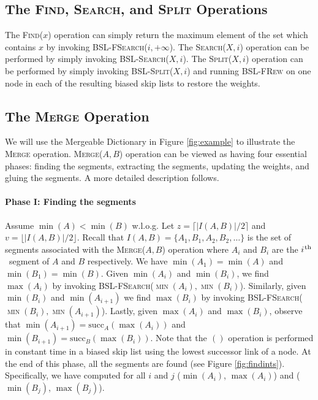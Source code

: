 \documentclass[11pt]{article}
\newcommand{\ens}[1]{\ensuremath{#1}}
\newcommand{\ith}{\ens{i^{\mbox{\hspace{.2mm}\scriptsize th}}}}
\newcommand{\Ds}{Mergeable Dictionary}
\newcommand{\kwMs}{Make-Set}
\newcommand{\kwSpl}{Split}
\newcommand{\kwUnion}{Merge}
\newcommand{\kwSrc}{Search}
\newcommand{\kwFind}{Find}
\newcommand{\Ms}{\mbox{\textsc{\kwMs}}}
\newcommand{\Spl}{\mbox{\textsc{\kwSpl}}}
\newcommand{\Splx}[2]{\mbox{\textsc{\kwSpl(\ensuremath{#1,#2})}}}
\newcommand{\Union}{\mbox{\textsc{\kwUnion{}}}}
\newcommand{\Unionx}[2]{\mbox{\textsc{\kwUnion(\ensuremath{#1,#2})}}}
\newcommand{\Src}{\mbox{\textsc{\kwSrc}}}
\newcommand{\Srcx}[2]{\mbox{\textsc{\kwSrc(\ensuremath{#1,#2})}}}
\newcommand{\Find}{\mbox{\textsc{\kwFind}}}
\newcommand{\Findx}[1]{\mbox{\textsc{\kwFind(\ensuremath{#1})}}}
\newcommand{\Bslfsrcx}[2]{\mbox{\textsc{BSL-FSearch(\ensuremath{#1,#2})}}}
\newcommand{\Bslfrew}{\mbox{\textsc{BSL-FRew}}}
\newcommand{\Bslsrcx}[2]{\mbox{\textsc{BSL-Search(\ensuremath{#1,#2})}}}
\newcommand{\Bslsplx}[2]{\mbox{\textsc{BSL-Split(\ensuremath{#1,#2})}}}
\newcommand{\segments}{{\segment}s}
\newcommand{\segment}{segment}
\newcommand{\lasta}{z}
\newcommand{\lastb}{v}
\newcommand{\intmax}[1]{\ensuremath{\max(\intl #1)}}
\newcommand{\intmin}[1]{\ensuremath{\min(\intl #1)}}
\newcommand{\intsubs}[2]{\ensuremath{I(\set{#1},\set{#2})}}
\newcommand{\intnum}[2]{\ensuremath{|I(\set{#1},\set{#2})|}}
\newcommand{\intl}[1]{\ensuremath{#1}}
\newcommand{\set}[1]{\ensuremath{#1}}
\newcommand{\suc}[2]{\text{succ}\ensuremath{_{#1}(#2)}}
\newcommand{\hide}[1]{}
\begin{document}
\subsection{The \hide{\Ms{}, }\Find{}, \Src{}, and \Spl{} Operations} 
\label{subsec:DSOthers} 


The \Findx{x} operation can simply return the maximum element of the set which contains $x$ by invoking \Bslfsrcx{i}{+\infty}. The \Srcx{X}{i} operation can be performed by simply invoking \Bslsrcx{X}{i}. The \Splx{X}{i} operation can be performed by simply invoking \Bslsplx{X}{i} and running \Bslfrew{} on one node in each of the resulting biased skip lists to restore the weights. 


\subsection{The \Union{} Operation} 
\label{subsec:DSUnion} 
We will use the \Ds{} in Figure \ref{fig:example} to illustrate the \Union{} operation. \Unionx{A}{B} operation can be viewed as having four essential phases: finding the \segments{}, extracting the \segments{}, updating the weights, and gluing the \segments{}. 
A more detailed description follows. 




\paragraph{Phase I: Finding the \segments{}} 
Assume $\intmin{A} < \intmin{B}$ w.l.o.g. Let $\lasta = \lceil\intnum{A}{B}/2\rceil$ and $\lastb = \lfloor\intnum{A}{B}/2\rfloor$. Recall that $\intsubs{A}{B} = \{\intl A_1, \intl B_1, \intl A_2, \intl B_2, \ldots\}$ is the set of \segments{} associated with the \Unionx{A}{B} operation where $\intl A_i$ and $\intl B_i$ are the \ith\ \segment{} of $A$ and $B$ respectively. We have $\intmin{A_1} = \intmin{A}$ and $\intmin{B_1} = \intmin{B}$. Given \intmin{A_i} and \intmin{B_i}, we find \intmax{A_i} by invoking \Bslfsrcx{\intmin{A_i}}{\intmin{B_i}}. Similarly, given \intmin{B_i} and \intmin{A_{i+1}} we find \intmax{B_i} by invoking \Bslfsrcx{\intmin{B_i}}{\intmin{A_{i+1}}}. Lastly, given \intmax{A_i} and \intmax{B_i}, observe that $\intmin{A_{i+1}} = \suc{A}{\intmax{A_i}}$ and $\intmin{B_{i+1}} = \suc{B}{\intmax{B_i}}$. 
Note that the \suc{}{} operation is performed in constant time in a biased skip list using the lowest successor link of a node. 
At the end of this phase, all the \segments{} are found (see Figure \ref{fig:findints}). Specifically, we have computed for all $i$ and $j$ (\intmin{A_i}, \intmax{A_i}) and (\intmin{B_j}, \intmax{B_j}). 
\end{document}
